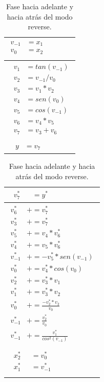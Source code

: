 \begin{table}[htp]
	\begin{center}
		\begin{tabular}{|l|} \hline
			$\begin{aligned}
			v_{-1} & = x_{1}	   \\
			v_{0}  & = x_{2}\\
			\end{aligned}$   	
			\\ \hline
			
			$\begin{aligned}
			\ \ v_{1} & = tan(v_{-1})   \\
			\ \ v_{2} & = v_{-1}/v_{0}  \\
			\ \ v_{3} & = v_{1}*v_{2}   \\
			\ \ v_{4} & = sen(v_{0})   \\
			\ \ v_{5} & = cos(v_{-1}) \\
			\ \ v_{6} & = v_{4}*v_{5} \\
			\ \ v_{7} & = v_{3}+v_{6}\\
			\end{aligned}$
			\\ \hline
			$\begin{aligned}
			\ \ \ y &= v_{7} 
			\end{aligned}$
			\\ \hline
        \end{tabular}
		\begin{tabular}{|l|} \hline
		$\begin{aligned}
		\ \ v_{7}^{*} \ \ \ \ &= y^{*}
	    \end{aligned}$
	    \\ \hline
		$\begin{aligned}
		v_{6}^{*}& += v_{7}^{*}	   \\
		v_{3}^{*}& += v_{7}^{*}	   \\
		v_{5}^{*}&+= v_{4}*v_{6}^{*} \\
		v_{4}^{*}&+= v_{5}*v_{6}^{*} \\ 
		v_{-1}^{*}&+= -v_{5}^{*}*sen(v_{-1})\\
		v_{0}^{*}&+= v_{4}^{*}*cos(v_{0})\\
		v_{2}^{*}&+=v_{3}^{*}*v_{1}\\
		v_{1}^{*}&+=v_{3}^{*}*v_{2}\\
		v_{0}^{*}&+= \frac{-v_{2}^{*}*v_{2}}{v_{0}}\\
		v_{-1}^{*}&+= \frac{v_{2}^{*}}{v_{0}}\\
		v_{-1}^{*}&+= \frac{v_{1}^{*}}{cos^{2}(v_{-1})}\\
	    \end{aligned}$
	    \\ \hline
		$\begin{aligned}
		\ \ x_{2}^{*} \ \ \ & = v_{0}^{*}\\
		\ \ x_{1}^{*} \ \ \ & = v_{-1}^{*} \\
		\end{aligned}$		
		\\ \hline
		\end{tabular}
	\caption {Fase hacia adelante y hacia atrás del modo reverse.} 
	\label{tab:table3}
	\end{center}
\end{table}

